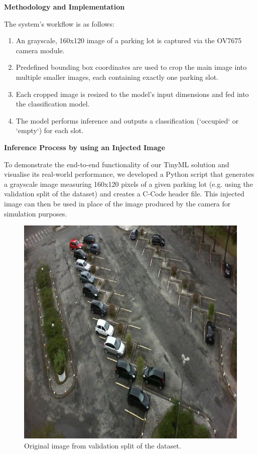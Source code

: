 \documentclass[sigconf,10pt,nonacm]{acmart}
\begin{document}
\noindent\textbf{Methodology and Implementation}

The system's workflow is as follows:
\begin{enumerate}
    \item An grayscale, 160x120 image of a parking lot is captured via the OV7675 camera module. 
    \item Predefined bounding box coordinates are used to crop the main image into multiple smaller images, each containing exactly one parking slot.
    \item Each cropped image is resized to the model's input dimensions and fed into the classification model.
    \item The model performs inference and outputs a classification (`occupied` or `empty`) for each slot.
\end{enumerate}

\noindent\textbf{Inference Process by using an Injected Image}

To demonstrate the end-to-end functionality of our TinyML solution and visualise its real-world performance, we developed a Python script that generates a grayscale image measuring 160x120 pixels of a given parking lot (e.g. using the validation split of the dataset) and creates a C-Code header file. This injected image can then be used in place of the image produced by the camera for simulation purposes.

\begin{figure}[h!]
    \centering
    \includegraphics[width=\linewidth]{./images/input.jpg}
    \caption{Original image from validation split of the dataset.}
    \label{fig:input}
\end{figure}
\end{document}
